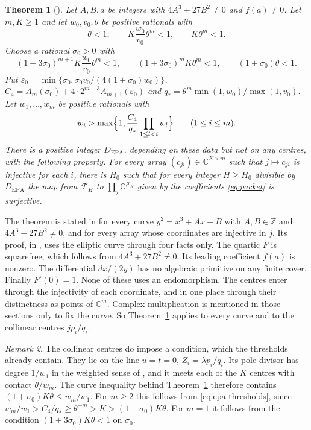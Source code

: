\documentclass[11pt]{amsart}
\newtheorem{theorem}{Theorem}[section]
\theoremstyle{definition}
\theoremstyle{remark}
\newtheorem{remark}[theorem]{Remark}
\numberwithin{equation}{section}
\newcommand{\Z}{\mathbb Z}
\newcommand{\C}{\mathbb C}
\newcommand{\cJ}{\mathcal J}
\newcommand{\cF}{\mathcal F}
\newcommand{\CM}{\cite{ChudnovskyChudnovsky26}}
\begin{document}
\begin{theorem}[{\cite[Corollary~13.5]{ChudnovskyChudnovsky26}}]\label{thm:epa}
Let $A,B,a$ be integers with $4A^3+27B^2\ne0$ and $f(a)\ne0$. Let $m,K\ge1$ and let $w_0,v_0,\theta$ be
positive rationals with
\begin{equation}\label{eq:epa-base}
 \theta<1,\qquad K\frac{w_0}{v_0}\theta^m<1,\qquad K\theta^m<1.
\end{equation}
Choose a rational $\sigma_0>0$ with
\[
 (1+3\sigma_0)^{m+1}K\frac{w_0}{v_0}\theta^m<1,\qquad(1+3\sigma_0)^mK\theta^m<1,\qquad(1+\sigma_0)\theta<1.
\]
Put $\varepsilon_0=\min\{\sigma_0,\sigma_0v_0/(4(1+\sigma_0)w_0)\}$,
$C_4=A_m(\sigma_0)+4\cdot2^{m+3}A_{m+1}(\varepsilon_0)$ and $q_*=\theta^m\min(1,w_0)/\max(1,v_0)$. Let
$w_1,\dots,w_m$ be positive rationals with
\begin{equation}\label{eq:epa-thresholds}
 w_i>\max\Bigl\{1,\frac{C_4}{q_*}\prod_{1\le l<i}w_l\Bigr\}\qquad(1\le i\le m).
\end{equation}
There is a positive integer $D_{\mathrm{EPA}}$, depending on these data but not on any centres, with the
following property. For every array $(c_{ji})\in\C^{K\times m}$ such that $j\mapsto c_{ji}$ is injective for
each $i$, there is $H_0$ such that for every integer $H\ge H_0$ divisible by $D_{\mathrm{EPA}}$ the map from
$\cF_H$ to $\prod_j\C^{\cJ_H}$ given by the coefficients \eqref{eq:packet} is surjective.
\end{theorem}

The theorem is stated in \CM{} for every curve $y^2=x^3+Ax+B$ with $A,B\in\Z$ and $4A^3+27B^2\ne0$, and for
every array whose coordinates are injective in $j$. Its proof, in \cite[Sections~4--13]{ChudnovskyChudnovsky26},
uses the elliptic curve through four facts only. The quartic $F$ is squarefree, which follows from
$4A^3+27B^2\ne0$. Its leading coefficient $f(a)$ is nonzero. The differential $dx/(2y)$ has no algebraic
primitive on any finite cover. Finally $F'(0)=1$. None of these uses an endomorphism. The centres enter through
the injectivity of each coordinate, and in one place through their distinctness as points of $\C^m$. Complex
multiplication is mentioned in those sections only to fix the curve. So Theorem~\ref{thm:epa} applies to every
curve and to the collinear centres $jp_i/q_i$.

\begin{remark}\label{rem:line}
The collinear centres do impose a condition, which the thresholds already contain. They lie on the line
$u=t=0$, $Z_i=\lambda p_i/q_i$. Its pole divisor has degree $1/w_1$ in the weighted sense of \CM, and it meets
each of the $K$ centres with contact $\theta/w_m$. The curve inequality behind Theorem~\ref{thm:epa} therefore
contains $(1+\sigma_0)K\theta\le w_m/w_1$. For $m\ge2$ this follows from \eqref{eq:epa-thresholds}, since
$w_m/w_1>C_4/q_*\ge\theta^{-m}>K>(1+\sigma_0)K\theta$. For $m=1$ it follows from the condition
$(1+3\sigma_0)K\theta<1$ on $\sigma_0$.
\end{remark}
\end{document}
